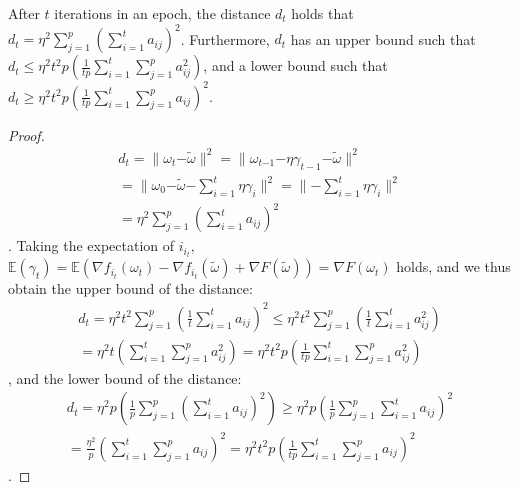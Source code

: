 \documentclass[letterpaper]{article}
\begin{document}
\begin{Theorem}
\label{theorem_vr_lower_bound}
   After $t$ iterations in an epoch, the distance $d_t$ holds that $d_t \mathrm{=} \eta^2 \sum\limits_{j=1}^p\left(  \sum\limits_{i=1}^t a_{ij}  \right)^2$. Furthermore, $d_t$ has an upper bound such that 
   $d_t \mathrm{\le} \eta^2 t^2p  \left( \frac{1}{tp}\sum\limits_{i=1}^t   \sum\limits_{j=1}^p   a_{ij}^2 \right)$, and a lower bound such that $d_t  \mathrm{\ge} \eta^2t^2p \left(\frac{1}{tp}\sum\limits_{i=1}^t   \sum\limits_{j=1}^p   a_{ij}\right)^2$.
\end{Theorem}
\begin{proof}
\begin{equation}
\begin{array}{ll}
d_{t} = \parallel \omega_{t}\mathrm{-}\tilde{\omega} \parallel^2 
=\parallel \omega_{{t\mathrm{-}1}}\mathrm{-}\eta \gamma_{t-1} \mathrm{-}\tilde{\omega} \parallel^2\\
= \parallel \omega_{0}\mathrm{-}\tilde{\omega}  \mathrm{-} \sum\limits_{i=1}^t \eta \gamma_i \parallel^2 
=\parallel \mathrm{-}\sum\limits_{i=1}^t \eta \gamma_i \parallel^2\\
= \eta^2 \sum\limits_{j=1}^p\left(  \sum\limits_{i=1}^t a_{ij}  \right)^2
\end{array}
\end{equation}. Taking the expectation of $i_{i_t}$,  $\mathbb{E}(\gamma_t) = \mathbb{E}(\nabla f_{i_t}(\omega_t)-\nabla f_{i_t}(\tilde{\omega})+\nabla F(\tilde{\omega})) = \nabla F(\omega_{t})$ holds,   and we thus obtain the upper bound of the distance:
\begin{equation}
\begin{array}{ll}
d_{t} = \eta^2 t^2 \sum\limits_{j=1}^p\left( \frac{1}{t} \sum\limits_{i=1}^t a_{ij}  \right)^2
\le \eta^2 t^2 \sum\limits_{j=1}^p\left( \frac{1}{t} \sum\limits_{i=1}^t a_{ij}^2  \right)\\
= \eta^2 t  \left( \sum\limits_{i=1}^t   \sum\limits_{j=1}^p   a_{ij}^2 \right) 
= \eta^2 t^2p  \left( \frac{1}{tp}\sum\limits_{i=1}^t   \sum\limits_{j=1}^p   a_{ij}^2 \right)
\end{array}
\end{equation}, and the lower bound of the distance:
\begin{equation}
\begin{array}{ll}
d_{t} = \eta^2 p \left( \frac{1}{p} \sum\limits_{j=1}^p\left( \sum\limits_{i=1}^t a_{ij}  \right)^2\right)
\ge \eta^2 p \left(  \frac{1}{p}  \sum\limits_{j=1}^p \sum\limits_{i=1}^t a_{ij}  \right)^2\\
= \frac{\eta^2}{p} \left(\sum\limits_{i=1}^t   \sum\limits_{j=1}^p   a_{ij}\right)^2  
= \eta^2t^2p \left(\frac{1}{tp}\sum\limits_{i=1}^t   \sum\limits_{j=1}^p   a_{ij}\right)^2
\end{array}
\end{equation}.
\end{proof}
\end{document}
